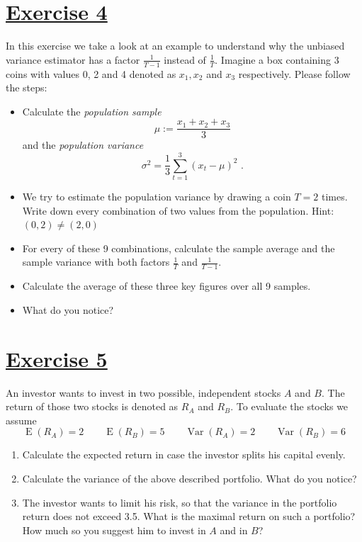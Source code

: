 \documentclass[captions=tableheading, 12pt, headings=small, parskip=half]{scrartcl}
\begin{document}
\section*{\underline{Exercise 4}}
In this exercise we take a look at an example to understand why the unbiased variance estimator has a factor $\frac{1}{T-1}$ instead of $\frac{1}{T}$. Imagine a box containing 3 coins with values 0, 2 and 4 denoted as $x_1, x_2$ and $x_3$ respectively. Please follow the steps:
\begin{itemize}
	\item Calculate the \textit{population sample} \[\mu := \frac{x_1 + x_2 + x_3}{3}\] and the \textit{population variance} \[\sigma^2 = \frac{1}{3}\sum_{t = 1}^3{(x_t - \mu)^2}\text{ .}\]
	\item We try to estimate the population variance by drawing a coin $T = 2$ times. Write down every combination of two values from the population. Hint: $(0, 2)\ne (2, 0)$
	\item For every of these 9 combinations, calculate the sample average and the sample variance with both factors $\frac{1}{T}$ and $\frac{1}{T-1}$.
	\item Calculate the average of these three key figures over all 9 samples.
	\item What do you notice?
\end{itemize}

\section*{\underline{Exercise 5}}

An investor wants to invest in two possible, independent stocks $A$ and $B$. The return of those two stocks is denoted as $R_A$ and $R_B$. To evaluate the stocks we assume
\[
\operatorname{E}(R_A) = 2 \qquad \operatorname{E}(R_B) = 5 \qquad \operatorname{Var}(R_A) = 2 \qquad \operatorname{Var}(R_B) = 6
\]
\begin{enumerate}[label = \alph*)]
	\item Calculate the expected return in case the investor splits his capital evenly.
	\item Calculate the variance of the above described portfolio. What do you notice?
	\item The investor wants to limit his risk, so that the variance in the portfolio return does not exceed 3.5. What is the maximal return on such a portfolio? How much so you suggest him to invest in $A$ and in $B$?
\end{enumerate}
\end{document}

